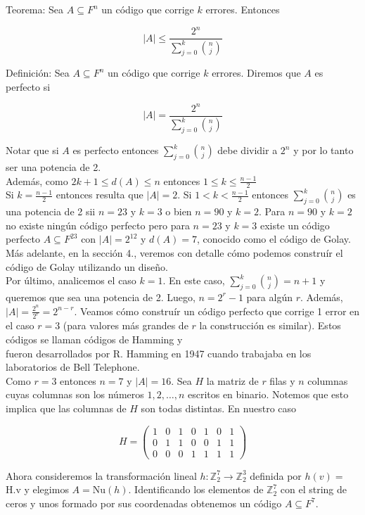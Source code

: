 \documentclass[10pt]{article}
\begin{document}
Teorema: Sea $A \subseteq F^{n}$ un código que corrige $k$ errores. Entonces

$$
|A| \leq \frac{2^{n}}{\sum_{j=0}^{k}\binom{n}{j}}
$$

Definición: Sea $A \subseteq F^{n}$ un código que corrige $k$ errores. Diremos que $A$ es perfecto si

$$
|A|=\frac{2^{n}}{\sum_{j=0}^{k}\binom{n}{j}}
$$

Notar que si $A$ es perfecto entonces $\sum_{j=0}^{k}\binom{n}{j}$ debe dividir a $2^{n}$ y por lo tanto ser una potencia de 2.\\
Además, como $2 k+1 \leq d(A) \leq n$ entonces $1 \leq k \leq \frac{n-1}{2}$\\
Si $k=\frac{n-1}{2}$ entonces resulta que $|A|=2$. Si $1<k<\frac{n-1}{2}$ entonces $\sum_{j=0}^{k}\binom{n}{j}$ es una potencia de 2 sii $n=23$ y $k=3$ o bien $n=90$ y $k=2$. Para $n=90$ y $k=2$ no existe ningún código perfecto pero para $n=23$ y $k=3$ existe un código perfecto $A \subseteq F^{23}$ con $|A|=2^{12}$ y $d(A)=7$, conocido como el código de Golay. Más adelante, en la sección 4., veremos con detalle cómo podemos construír el código de Golay utilizando un diseño.\\
Por último, analicemos el caso $k=1$. En este caso, $\sum_{j=0}^{k}\binom{n}{j}=n+1$ y queremos que sea una potencia de 2. Luego, $n=2^{r}-1$ para algún $r$. Además, $|A|=\frac{2^{n}}{2^{r}}=2^{n-r}$. Veamos cómo construír un código perfecto que corrige 1 error en el caso $r=3$ (para valores más grandes de $r$ la construcción es similar). Estos códigos se llaman códigos de Hamming y\\
fueron desarrollados por R. Hamming en 1947 cuando trabajaba en los laboratorios de Bell Telephone.\\
Como $r=3$ entonces $n=7$ y $|A|=16$. Sea $H$ la matriz de $r$ filas y $n$ columnas cuyas columnas son los números $1,2, \ldots, n$ escritos en binario. Notemos que esto implica que las columnas de $H$ son todas distintas. En nuestro caso

$$
H=\left(\begin{array}{lllllll}
1 & 0 & 1 & 0 & 1 & 0 & 1 \\
0 & 1 & 1 & 0 & 0 & 1 & 1 \\
0 & 0 & 0 & 1 & 1 & 1 & 1
\end{array}\right)
$$

Ahora consideremos la transformación lineal $h: \mathbb{Z}_{2}^{7} \longrightarrow \mathbb{Z}_{2}^{3}$ definida por $h(v)=$ H.v y elegimos $A=\mathrm{Nu}(h)$. Identificando los elementos de $\mathbb{Z}_{2}^{7}$ con el string de ceros y unos formado por sus coordenadas obtenemos un código $A \subseteq F^{7}$.
\end{document}

